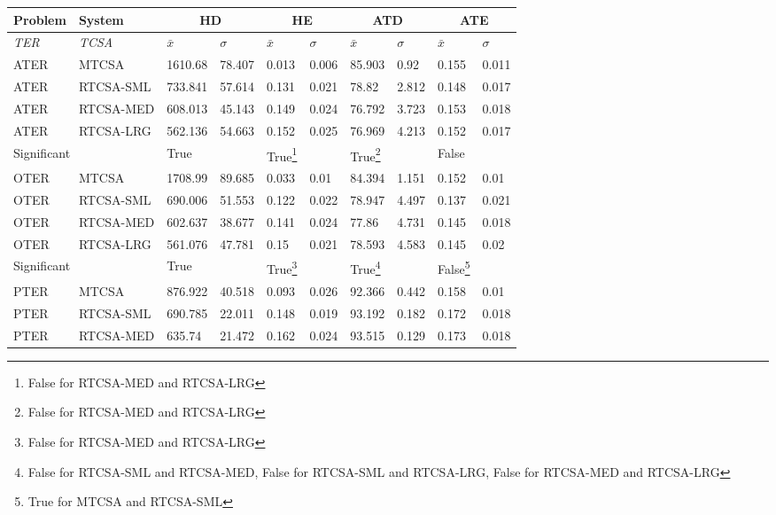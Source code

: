 \begin{table}[H]
	\centering\small
		\begin{minipage}{\textwidth} 		
			\begin{tabular}{llllllllll}
			\toprule
			\textbf{Problem} & \textbf{System} & \multicolumn{2}{c}{\textbf{HD}} & \multicolumn{2}{c}{\textbf{HE}} & \multicolumn{2}{c}{\textbf{ATD}} & \multicolumn{2}{c}{\textbf{ATE}} \\ 
			\midrule
			\emph{TER} & \emph{TCSA} & $\bar{x}$ & $\sigma$ & $\bar{x}$ & $\sigma$ & $\bar{x}$ & $\sigma$ & $\bar{x}$ & $\sigma$ \\ 
			\toprule
			ATER & MTCSA & 1610.68 & 78.407 & 0.013 & 0.006 & 85.903 & 0.92 & 0.155 & 0.011 \\ 
			ATER & RTCSA-SML & 733.841 & 57.614 & 0.131 & 0.021 & 78.82 & 2.812 & 0.148 & 0.017 \\ 
			ATER & RTCSA-MED & 608.013 & 45.143 & 0.149 & 0.024 & 76.792 & 3.723 & 0.153 & 0.018 \\ 
			ATER & RTCSA-LRG & 562.136 & 54.663 & 0.152 & 0.025 & 76.969 & 4.213 & 0.152 & 0.017 \\ 
			\multicolumn{2}{l}{Significant} & True & & True\footnote{False for RTCSA-MED and RTCSA-LRG} & & True\footnote{False for RTCSA-MED and RTCSA-LRG} & & False & \\
			\midrule
			OTER & MTCSA & 1708.99 & 89.685 & 0.033 & 0.01 & 84.394 & 1.151 & 0.152 & 0.01 \\ 
			OTER & RTCSA-SML & 690.006 & 51.553 & 0.122 & 0.022 & 78.947 & 4.497 & 0.137 & 0.021 \\ 
			OTER & RTCSA-MED & 602.637 & 38.677 & 0.141 & 0.024 & 77.86 & 4.731 & 0.145 & 0.018 \\ 
			OTER & RTCSA-LRG & 561.076 & 47.781 & 0.15 & 0.021 & 78.593 & 4.583 & 0.145 & 0.02 \\ 
			\multicolumn{2}{l}{Significant} & True & & True\footnote{False for RTCSA-MED and RTCSA-LRG} & & True\footnote{False for RTCSA-SML and RTCSA-MED, False for RTCSA-SML and RTCSA-LRG, False for RTCSA-MED and RTCSA-LRG} & & False\footnote{True for MTCSA and RTCSA-SML} & \\
			\midrule
			PTER & MTCSA & 876.922 & 40.518 & 0.093 & 0.026 & 92.366 & 0.442 & 0.158 & 0.01 \\ 
			PTER & RTCSA-SML & 690.785 & 22.011 & 0.148 & 0.019 & 93.192 & 0.182 & 0.172 & 0.018 \\ 
			PTER & RTCSA-MED & 635.74 & 21.472 & 0.162 & 0.024 & 93.515 & 0.129 & 0.173 & 0.018 \\ 

\end{tabular}
\end{minipage}
\end{table}
